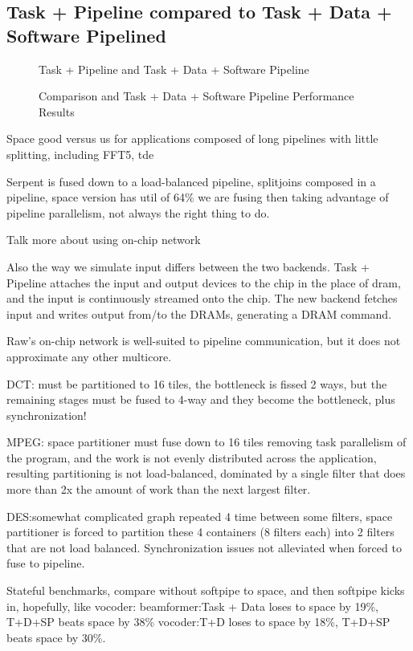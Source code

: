 \subsection{Task + Pipeline compared to Task + Data + Software
Pipelined}

\begin{figure}[t]
\centering
{}
\caption{Task + Pipeline and Task + Data + Software Pipeline
\protect\label{fig:vs-space}}
\end{figure}

\begin{figure*}[t]
\centering
{}
\caption{Comparison and Task + Data + Software Pipeline Performance Results
\protect\label{fig:thruput}}
\end{figure*}

Space good versus us for applications composed of long pipelines with little
splitting, including FFT5, tde

Serpent is fused down to a load-balanced pipeline, splitjoins
composed in a pipeline, space version has util of 64\% we are fusing
then taking advantage of pipeline parallelism, not always the right
thing to do.

Talk more about using on-chip network

Also the way we simulate input differs between the two backends.  Task
+ Pipeline attaches the input and output devices to the chip in the
place of dram, and the input is continuously streamed onto the chip.
The new backend fetches input and writes output from/to the DRAMs,
generating a DRAM command.

Raw's on-chip network is well-suited to pipeline communication, but it
does not approximate any other multicore.

DCT: must be partitioned to 16 tiles, the bottleneck is fissed 2 ways,
but the remaining stages must be fused to 4-way and they become the
bottleneck, plus synchronization!

MPEG: space partitioner must fuse down to 16 tiles removing task
parallelism of the program, and the work is not evenly distributed
across the application, resulting partitioning is not load-balanced,
dominated by a single filter that does more than 2x the amount of work
than the next largest filter.

DES:somewhat complicated graph repeated 4 time between some filters,
space partitioner is forced to partition these 4 containers (8 filters
each) into 2 filters that are not load balanced.  Synchronization
issues not alleviated when forced to fuse to pipeline.

Stateful benchmarks, compare without softpipe to space, and
then softpipe kicks in, hopefully, like 
vocoder:
beamformer:Task + Data loses to space by 19\%, T+D+SP beats space by
38\%
vocoder:T+D loses to space by 18\%, T+D+SP beats space by 30\%.

